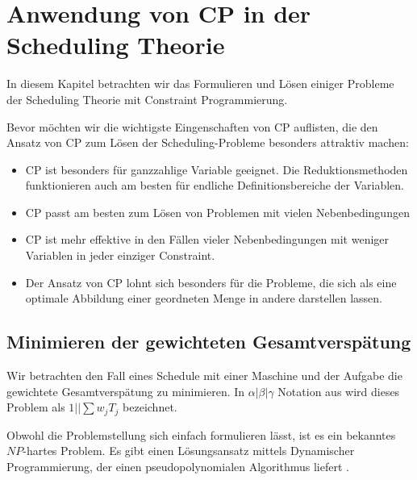 \chapter{ Anwendung von CP in der Scheduling Theorie}

In diesem Kapitel betrachten wir das Formulieren und Lösen einiger Probleme der Scheduling Theorie mit Constraint Programmierung.

Bevor möchten wir die wichtigste Eingenschaften von CP auflisten, die den Ansatz von CP zum Lösen der Scheduling-Probleme besonders attraktiv machen:
\begin{itemize} \itemsep0pt
	\item CP ist besonders für ganzzahlige Variable geeignet. Die Reduktionsmethoden funktionieren auch am besten für endliche Definitionsbereiche der Variablen.
	\item CP passt am besten zum Lösen von Problemen mit vielen Nebenbedingungen
	\item CP ist mehr effektive in den Fällen vieler Nebenbedingungen mit weniger Variablen in jeder einziger Constraint.
	\item Der Ansatz von CP lohnt sich besonders für die Probleme, die sich als eine optimale Abbildung einer geordneten Menge in andere darstellen lassen.
\end{itemize}


\section{Minimieren der gewichteten Gesamtverspätung}
Wir betrachten den Fall eines Schedule mit einer Maschine und der Aufgabe die gewichtete Gesamtverspätung zu minimieren. In $\alpha|\beta|\gamma$ Notation aus \cite{Pinedo} wird dieses Problem als $1||\sum{w_jT_j}$ bezeichnet.

Obwohl die Problemstellung sich einfach formulieren lässt, ist es ein bekanntes $NP$-hartes Problem. Es gibt einen Lösungsansatz mittels Dynamischer Programmierung, der einen pseudopolynomialen Algorithmus liefert \citep[vgl.][]{Pinedo}.

%
%


